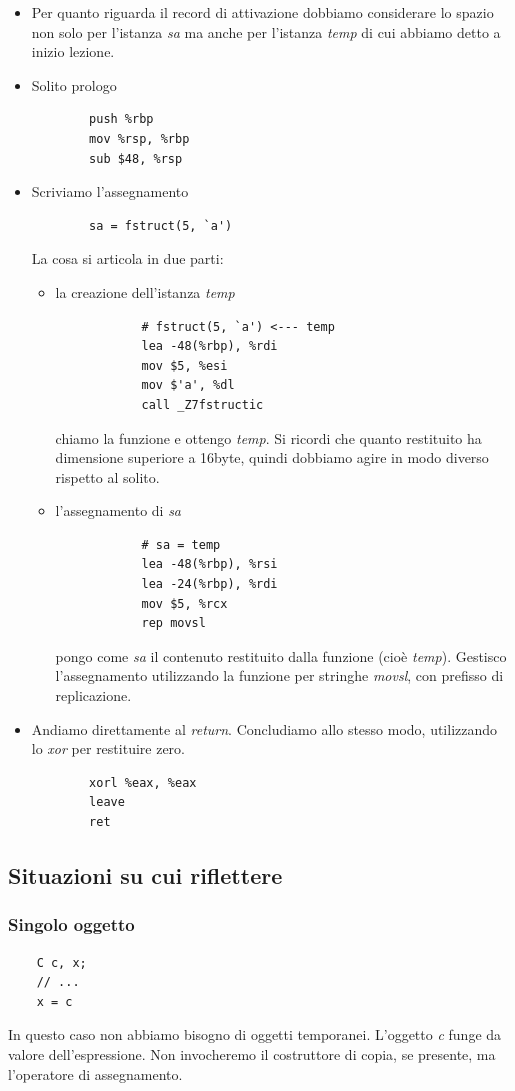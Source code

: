 \begin{itemize}
	\item Per quanto riguarda il record di attivazione dobbiamo considerare lo spazio non solo per l'istanza \emph{sa} ma anche per l'istanza \emph{temp} di cui abbiamo detto a inizio lezione.
	\item Solito prologo
	\begin{verbatim}
		push %rbp
		mov %rsp, %rbp
		sub $48, %rsp
	\end{verbatim}
	\item Scriviamo l'assegnamento
	\begin{verbatim}
		sa = fstruct(5, `a')
	\end{verbatim}
	La cosa si articola in due parti:
	\begin{itemize}
		\item la creazione dell'istanza \emph{temp}
		\begin{verbatim}
			# fstruct(5, `a') <--- temp
			lea -48(%rbp), %rdi
			mov $5, %esi
			mov $'a', %dl
			call _Z7fstructic
		\end{verbatim}
		chiamo la funzione e ottengo \emph{temp}. Si ricordi che quanto restituito ha dimensione superiore a 16byte, quindi dobbiamo agire in modo diverso rispetto al solito.
		\item l'assegnamento di \emph{sa}
		\begin{verbatim}    
			# sa = temp
			lea -48(%rbp), %rsi
			lea -24(%rbp), %rdi
			mov $5, %rcx
			rep movsl
		\end{verbatim}
		pongo come \emph{sa} il contenuto restituito dalla funzione (cioè \emph{temp}). Gestisco l'assegnamento utilizzando la funzione per stringhe \emph{movsl}, con prefisso di replicazione.
	\end{itemize}
	\item Andiamo direttamente al \emph{return}. Concludiamo allo stesso modo, utilizzando lo \emph{xor} per restituire zero.
	\begin{verbatim}
		xorl %eax, %eax
		leave
		ret
	\end{verbatim}
\end{itemize}
\endgroup

\subsection{Situazioni su cui riflettere}
\subsubsection{Singolo oggetto}
\begin{verbatim}
	C c, x;
	// ...
	x = c
\end{verbatim}
In questo caso non abbiamo bisogno di oggetti temporanei. L'oggetto \emph{c} funge da valore dell'espressione. Non invocheremo il costruttore di copia, se presente, ma l'operatore di assegnamento.
